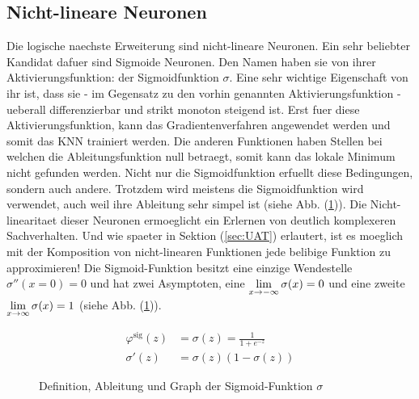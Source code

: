 \subsection{Nicht-lineare Neuronen}
Die logische naechste Erweiterung sind nicht-lineare Neuronen.
Ein sehr beliebter Kandidat dafuer sind Sigmoide Neuronen.
Den Namen haben sie von ihrer Aktivierungsfunktion: der Sigmoidfunktion $\sigma$.
Eine sehr wichtige Eigenschaft von ihr ist, dass sie - im Gegensatz zu den vorhin
genannten Aktivierungsfunktion - ueberall differenzierbar und strikt monoton
steigend ist. Erst fuer diese Aktivierungsfunktion, kann das Gradientenverfahren
angewendet werden und somit das KNN trainiert werden. Die anderen
Funktionen haben Stellen bei welchen die Ableitungsfunktion null
betraegt, somit kann das lokale Minimum nicht gefunden werden.
\para{}
Nicht nur die Sigmoidfunktion erfuellt diese Bedingungen, sondern auch andere.
Trotzdem wird meistens die Sigmoidfunktion wird
verwendet, auch weil ihre Ableitung sehr simpel ist (siehe Abb. (\ref{fig:sigmoid})).
Die Nicht-linearitaet dieser Neuronen ermoeglicht ein Erlernen von deutlich komplexeren Sachverhalten.
Und wie spaeter in Sektion (\ref{sec:UAT}) erlautert, ist es moeglich mit der Komposition von nicht-linearen
Funktionen jede belibige Funktion zu approximieren!
\para{}
Die Sigmoid-Funktion besitzt eine einzige Wendestelle $\sigma''(x=0)=0$ und hat
zwei Asymptoten, eine $\displaystyle\lim_{x \to -\infty} \sigma(x)=0$
und eine zweite $\displaystyle\lim_{x \to \infty} \sigma(x)=1$ (siehe Abb. (\ref{fig:sigmoid})).
\\
\begin{figure}[h!]
  \begin{minipage}[h!]{0.5\textwidth}
    \begin{align*}
      \varphi^{\text{sig}}(z) &= \sigma(z) = \frac{1}{1 + e^{-z}}\\
      \sigma'(z)&=\sigma(z)(1-\sigma(z))
    \end{align*}
  \end{minipage}
  \begin{minipage}[h!]{0.5\textwidth}
    \centering
  \end{minipage}
  \caption{Definition, Ableitung und Graph der Sigmoid-Funktion $\sigma$}
  \label{fig:sigmoid}
\end{figure}


